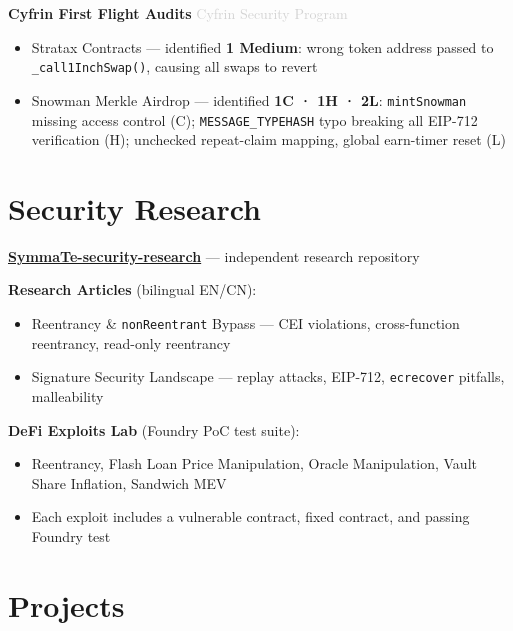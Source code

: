 \documentclass[9pt, a4paper]{article}
\begin{document}
\vspace{4pt}
\noindent\textbf{Cyfrin First Flight Audits} \hfill \textcolor{lightgray}{\small Cyfrin Security Program}

\begin{itemize}
  \item Stratax Contracts --- identified \textbf{1 Medium}: wrong token address passed to \texttt{\_call1InchSwap()}, causing all swaps to revert
  \item Snowman Merkle Airdrop --- identified \textbf{1C · 1H · 2L}: \texttt{mintSnowman} missing access control (C); \texttt{MESSAGE\_TYPEHASH} typo breaking all EIP-712 verification (H); unchecked repeat-claim mapping, global earn-timer reset (L)
\end{itemize}


\section{Security Research}

\noindent\href{https://github.com/SymmaTe/SymmaTe-security-research}{\textbf{SymmaTe-security-research}} --- independent research repository

\vspace{4pt}
\noindent\textbf{Research Articles} (bilingual EN/CN):
\begin{itemize}
  \item Reentrancy \& \texttt{nonReentrant} Bypass --- CEI violations, cross-function reentrancy, read-only reentrancy
  \item Signature Security Landscape --- replay attacks, EIP-712, \texttt{ecrecover} pitfalls, malleability
\end{itemize}

\vspace{4pt}
\noindent\textbf{DeFi Exploits Lab} (Foundry PoC test suite):
\begin{itemize}
  \item Reentrancy, Flash Loan Price Manipulation, Oracle Manipulation, Vault Share Inflation, Sandwich MEV
  \item Each exploit includes a vulnerable contract, fixed contract, and passing Foundry test
\end{itemize}


\section{Projects}
\end{document}

